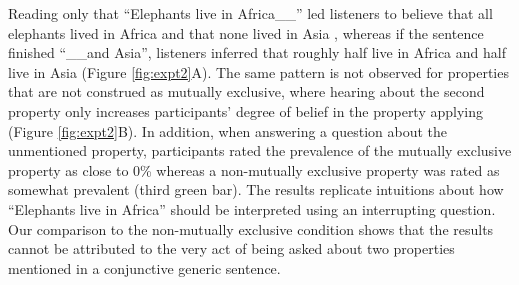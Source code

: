 \documentclass[10pt,letterpaper]{article}
\newcommand{\mh}[1]{{\textcolor{Blue}{[mh: #1]}}}
\begin{document}
Reading only that ``Elephants live in Africa\_\_'' led listeners to believe that all elephants lived in Africa and that none lived in Asia , whereas if the sentence finished ``\_\_and Asia'', listeners inferred that roughly half live in Africa and half live in Asia (Figure \ref{fig:expt2}A). 
The same pattern is not observed for properties that are not construed as mutually exclusive, where hearing about the second property only increases participants' degree of belief in the property applying (Figure \ref{fig:expt2}B).
In addition, when answering a question about the unmentioned property, participants rated the prevalence of the mutually exclusive property as close to 0\% whereas a non-mutually exclusive property was rated as somewhat prevalent (third green bar).
The results replicate intuitions about how ``Elephants live in Africa'' should be interpreted using an interrupting question.
Our comparison to the non-mutually exclusive condition shows that the results cannot be attributed to the very act of being asked about two properties mentioned in a conjunctive generic sentence.


\end{document}
